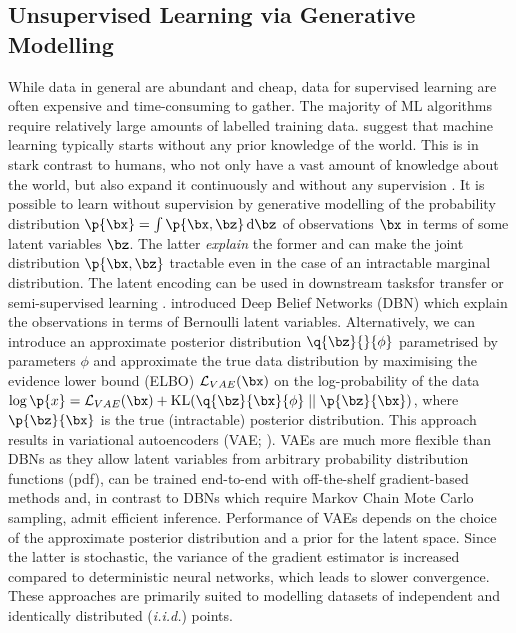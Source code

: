     \subsection{Unsupervised Learning via Generative Modelling}
    \label{sec:unsupervised}
       While data in general are abundant and cheap, data for supervised learning are often expensive and time-consuming to gather. The majority of ML algorithms require relatively large amounts of labelled training data. \cite{Lake2016} suggest that machine learning typically starts without any prior knowledge of the world. This is in stark contrast to humans, who not only have a vast amount of knowledge about the world, but also expand it continuously and without any supervision \citep{Friston2009guide}. It is possible to learn without supervision by generative modelling of the probability distribution $\p{\bx} = \int \p{\bx, \bz} \dint \bz$ of observations $\bx$ in terms of some latent variables $\bz$. The latter \emph{explain} the former and can make the joint distribution $\p{\bx, \bz}$ tractable even in the case of an intractable marginal distribution. The latent encoding can be used in downstream tasks\eg for transfer or semi-supervised learning \citep{Pan2010}. \cite{Hinton2006dbn} introduced Deep Belief Networks (DBN) which explain the observations in terms of Bernoulli latent variables. Alternatively, we can introduce an approximate posterior distribution $\q{\bz}{}{\phi}$ parametrised by parameters $\phi$ and approximate the true data distribution by maximising the evidence lower bound (ELBO) $\loss[VAE]{\bx}$ on the log-probability of the data $\log \p{x} = \loss[VAE]{\bx} + \kl{ \q{\bz}{\bx}{\phi} }{ \p{\bz}{\bx} }$, where $\p{\bz}{\bx}$ is the true (intractable) posterior distribution. This approach results in variational autoencoders (VAE; \cite{Kingma2014,Rezende2014}). VAEs are much more flexible than DBNs as they allow latent variables from arbitrary probability distribution functions (pdf), can be trained end-to-end with off-the-shelf gradient-based methods and, in contrast to DBNs which require Markov Chain Mote Carlo sampling, admit efficient inference. Performance of VAEs depends on the choice of the approximate posterior distribution and a prior for the latent space. Since the latter is stochastic, the variance of the gradient estimator is increased compared to deterministic neural networks, which leads to slower convergence. These approaches are primarily suited to modelling datasets of independent and identically distributed (\emph{i.i.d.}) points.
       
